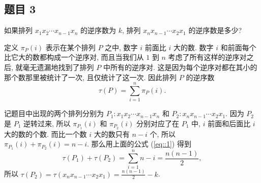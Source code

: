 \subsection*{题目 3}
\begin{problem*}
如果排列 $x_1 x_2 \cdots x_{n - 1} x_n$ 的逆序数为 $k$, 排列 $x_n x_{n - 1} \cdots x_2 x_1$ 的逆序数是多少?
\end{problem*}
\begin{solution}
定义 $\pi_{P}(i)$ 表示在某个排列 $P$ 之中, 数字 $i$ 前面比 $i$ 大的数. 数字 $i$ 和前面每个比它大的数都构成一个逆序对, 而且当我们从 $1$ 到 $n$ 考虑了所有这样的逆序对之后, 就毫无遗漏地找到了排列 $P$ 中所有的逆序对. 这是因为每个逆序对都在其小的那个数那里被统计了一次, 且仅统计了这一次. 因此排列 $P$ 的逆序数
\begin{equation*}\label{eq::1}
    \tau(P) = \sum_{i = 1}^{n} \pi_{P}(i). \tag{$\ast$}
\end{equation*}

记题目中出现的两个排列分别为 $P_1 \colon x_1 x_2 \cdots x_{n - 1} x_n$ 和 $P_2 \colon x_n x_{n - 1} \cdots x_2 x_1$. 因为 $P_2$ 是 $P_1$ 逆转过来, 所以 $\pi_{P_1}(i)$ 和 $\pi_{P_2}(i)$ 分别对应了在 $P_1$ 中, $i$ 前面和后面比 $i$ 大的数的个数. 而比一个数 $i$ 大的数只有 $n - i$ 个, 所以 $\pi_{P_1}(i) + \pi_{P_2}(i) = n - i$. 那么用上面的公式 (\ref{eq::1}) 得到 
\[
    \tau(P_1) + \tau(P_2) = \sum_{i = 1}^{n} n - i = \frac{n(n - 1)}{2},
\]
所以 $\tau(P_2) = \tau(x_n x_{n - 1} \cdots x_2 x_1) = \frac{n(n - 1)}{2} - k$.
\end{solution}

\newpage
